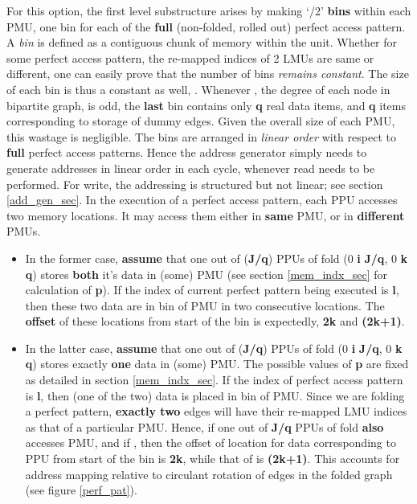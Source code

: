 \documentclass[12pt]{article}
\begin{document}
For this option, the first level substructure arises by making `/2'
\textbf{bins} within each PMU, one bin for each of the
 \textbf{full} (non-folded, rolled out) perfect access pattern.
A \textit{bin} is defined as a contiguous chunk of memory within
the unit. Whether
for some perfect access pattern, the re-mapped indices of 2 LMUs are same
or different, one can easily prove that the number of bins \textit{remains
constant}. The size of each bin is thus a constant as well, . Whenever , the degree of each node in
bipartite graph, is odd, the \textbf{last} bin contains only \textbf{q}
real data items, and \textbf{q} items corresponding to storage of dummy
edges. Given the overall size of each PMU, this wastage is
negligible. The bins are arranged in \textit{linear order} with respect to \textbf{full} perfect access patterns.
Hence the address generator simply needs to generate addresses in linear
order in each cycle, whenever read needs to be performed. For
write, the addressing is structured but not linear; see section \ref{add_gen_sec}.
In the execution of a perfect access pattern, each PPU accesses two
memory locations. It may access them either in \textbf{same} PMU, or in
\textbf{different} PMUs.
\begin{itemize}
\item In the former case, \textbf{assume} that 
one out of (\textbf{J/q}) PPUs of  fold (0 
\textbf{i}  \textbf{J/q}, 0  \textbf{k}  \textbf{q})
stores \textbf{both} it's data in (some)
 PMU (see section \ref{mem_indx_sec} for
calculation of \textbf{p}). If the index of current perfect
pattern being executed is \textbf{l}, then these two data are in
 bin of  PMU in two consecutive
locations. The \textbf{offset} of these locations from start of the bin is
expectedly, \textbf{2k}
and \textbf{(2k+1)}.
\item In the latter case, \textbf{assume} that 
one out of (\textbf{J/q}) PPUs of  fold (0 
\textbf{i}  \textbf{J/q}, 0  \textbf{k}  \textbf{q})
stores exactly \textbf{one} data in (some)
 PMU. The possible values of \textbf{p} are fixed
as detailed in section \ref{mem_indx_sec}. If the index of perfect access pattern
is \textbf{l}, then (one of the two) data is placed in  bin
of  PMU. Since we are folding a perfect
pattern, \textbf{exactly two} edges will have their re-mapped
LMU indices as that of a particular PMU. Hence,
if  one out of \textbf{J/q} PPUs of
 fold \textbf{also} accesses
 PMU, and if  
, then the offset of location for data
corresponding to  PPU from start of the bin
is \textbf{2k}, while that of
 is \textbf{(2k+1)}.
This accounts for address mapping relative to circulant rotation of edges
in the folded graph (see figure \ref{perf_pat}).
\end{itemize}
\end{document}
